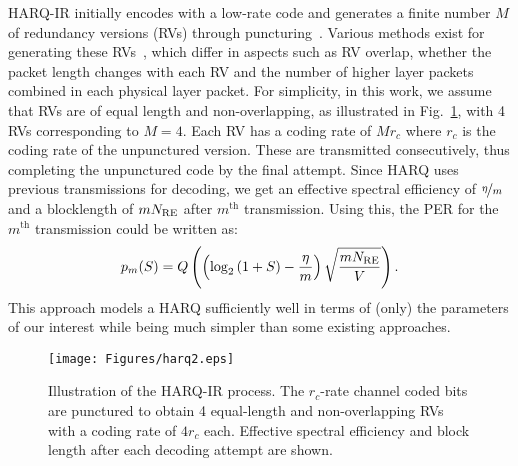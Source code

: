 HARQ-IR initially encodes with a low-rate code and generates a finite number $M$ of redundancy versions (RVs) through puncturing~\cite{HarqIRCommEngDeskRef}. 
Various methods exist for generating these RVs~\cite{HarqIRCommEngDeskRef,szczecinski2013rate,heidarzadeh2018systematic}, which differ in aspects such as RV overlap, whether the packet length changes with each RV and the number of higher layer packets combined in each physical layer packet. 
For simplicity, in this work, we assume that RVs are of equal length and non-overlapping, as illustrated in Fig.~\ref{fig:harqprocess2}, with 4 RVs corresponding to $M=4$.
Each RV has a coding rate of $Mr_c$ where $r_c$ is the coding rate of the unpunctured version. These are transmitted consecutively, thus completing the unpunctured code by the final attempt. 
Since HARQ uses previous transmissions for decoding, we get an effective spectral efficiency of $\nicefrac{\eta}{m}$ and a blocklength of $mN_{\mathrm{RE}}$ after $m^{\text{th}}$ transmission.
Using this, the PER for the $m^{\text{th}}$ transmission could be written as:
\begin{equation}
    p_m({S})=Q\left(\left(\log_2\left(1+{S}\right)-\frac{\eta}{m}\right)\sqrt{\frac{mN_{\mathrm{RE}}}{V}}\right).\label{eq:secModel_perHARQ_instSNR}
\end{equation}
This approach models a HARQ sufficiently well in terms of (only) the parameters of our interest while being much simpler than some existing approaches.
\begin{figure}[t]
\centering
\texttt{[image: Figures/harq2.eps]}
\caption{Illustration of the HARQ-IR process. The $r_c$-rate channel coded bits are punctured to obtain 4 equal-length and non-overlapping RVs with a coding rate of $4r_c$ each. Effective spectral efficiency and block length after each decoding attempt are shown.}
\label{fig:harqprocess2}
\end{figure}

